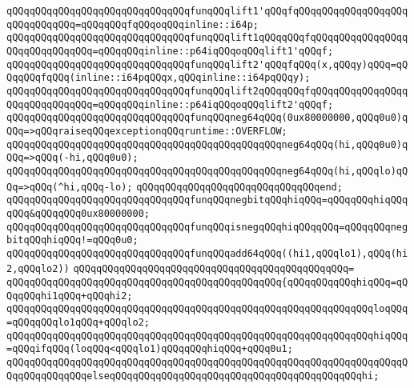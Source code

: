 \newline
\verb|qQQqqQQqqQQqqQQqqQQqqQQqqQQqqQQqfunqQQqlift1'qQQqfqQQqqQQqqQQqqQQqqQQqqQQqqQQqqQQq=qQQqqQQqfqQQqoqQQqinline::i64p;|\newline
\verb|qQQqqQQqqQQqqQQqqQQqqQQqqQQqqQQqfunqQQqlift1qQQqqQQqfqQQqqQQqqQQqqQQqqQQqqQQqqQQqqQQq=qQQqqQQqinline::p64iqQQqoqQQqlift1'qQQqf;|\newline
\newline
\verb|qQQqqQQqqQQqqQQqqQQqqQQqqQQqqQQqfunqQQqlift2'qQQqfqQQq(x,qQQqy)qQQq=qQQqqQQqfqQQq(inline::i64pqQQqx,qQQqinline::i64pqQQqy);|\newline
\verb|qQQqqQQqqQQqqQQqqQQqqQQqqQQqqQQqfunqQQqlift2qQQqqQQqfqQQqqQQqqQQqqQQqqQQqqQQqqQQqqQQq=qQQqqQQqinline::p64iqQQqoqQQqlift2'qQQqf;|\newline
\newline
\verb|qQQqqQQqqQQqqQQqqQQqqQQqqQQqqQQqfunqQQqneg64qQQq(0ux80000000,qQQq0u0)qQQq=>qQQqraiseqQQqexceptionqQQqruntime::OVERFLOW;|\newline
\verb|qQQqqQQqqQQqqQQqqQQqqQQqqQQqqQQqqQQqqQQqqQQqqQQqneg64qQQq(hi,qQQq0u0)qQQq=>qQQq(-hi,qQQq0u0);|\newline
\verb|qQQqqQQqqQQqqQQqqQQqqQQqqQQqqQQqqQQqqQQqqQQqqQQqneg64qQQq(hi,qQQqlo)qQQq=>qQQq(^hi,qQQq-lo);|\newline
\verb|qQQqqQQqqQQqqQQqqQQqqQQqqQQqqQQqend;|\newline
\newline
\verb|qQQqqQQqqQQqqQQqqQQqqQQqqQQqqQQqfunqQQqnegbitqQQqhiqQQq=qQQqqQQqhiqQQqqQQq&qQQqqQQq0ux80000000;|\newline
\verb|qQQqqQQqqQQqqQQqqQQqqQQqqQQqqQQqfunqQQqisnegqQQqhiqQQqqQQq=qQQqqQQqnegbitqQQqhiqQQq!=qQQq0u0;|\newline
\newline
\verb|qQQqqQQqqQQqqQQqqQQqqQQqqQQqqQQqfunqQQqadd64qQQq((hi1,qQQqlo1),qQQq(hi2,qQQqlo2))|\newline
\verb|qQQqqQQqqQQqqQQqqQQqqQQqqQQqqQQqqQQqqQQqqQQqqQQq=|\newline
\verb|qQQqqQQqqQQqqQQqqQQqqQQqqQQqqQQqqQQqqQQqqQQqqQQq{qQQqqQQqqQQqhiqQQq=qQQqqQQqhi1qQQq+qQQqhi2;|\newline
\verb|qQQqqQQqqQQqqQQqqQQqqQQqqQQqqQQqqQQqqQQqqQQqqQQqqQQqqQQqqQQqqQQqloqQQq=qQQqqQQqlo1qQQq+qQQqlo2;|\newline
\newline
\verb|qQQqqQQqqQQqqQQqqQQqqQQqqQQqqQQqqQQqqQQqqQQqqQQqqQQqqQQqqQQqqQQqhiqQQq=qQQqifqQQq(loqQQq<qQQqlo1)qQQqqQQqhiqQQq+qQQq0u1;|\newline
\verb|qQQqqQQqqQQqqQQqqQQqqQQqqQQqqQQqqQQqqQQqqQQqqQQqqQQqqQQqqQQqqQQqqQQqqQQqqQQqqQQqqQQqelseqQQqqQQqqQQqqQQqqQQqqQQqqQQqqQQqqQQqqQQqqQQqhi;|\newline
